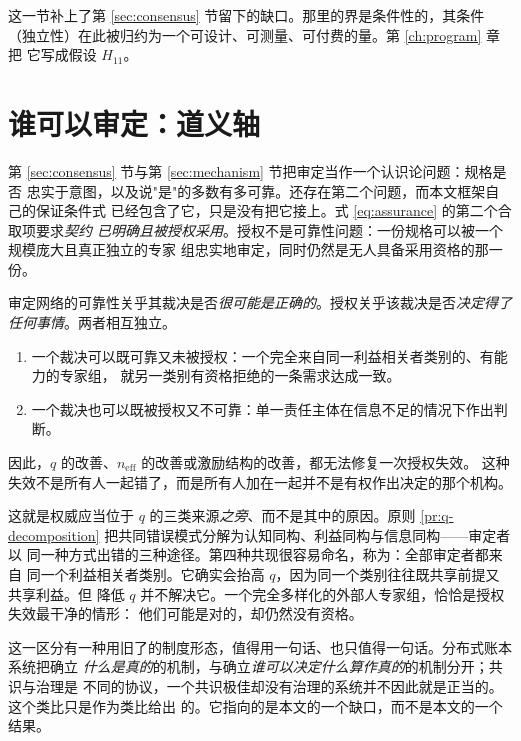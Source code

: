 这一节补上了第 \ref{sec:consensus} 节留下的缺口。那里的界是条件性的，其条件
（独立性）在此被归约为一个可设计、可测量、可付费的量。第 \ref{ch:program} 章把
它写成假设 $H_{11}$。

\section{谁可以审定：道义轴}\label{sec:authority}

第 \ref{sec:consensus} 节与第 \ref{sec:mechanism} 节把审定当作一个认识论问题：规格是否
忠实于意图，以及说"是"的多数有多可靠。还存在第二个问题，而本文框架自己的保证条件式
已经包含了它，只是没有把它接上。式 \eqref{eq:assurance} 的第二个合取项要求\emph{契约
已明确且被授权采用}。授权不是可靠性问题：一份规格可以被一个规模庞大且真正独立的专家
组忠实地审定，同时仍然是无人具备采用资格的那一份。

\begin{principle}[授权是一条独立的失效轴]\label{pr:authority}
审定网络的可靠性关乎其裁决是否\emph{很可能是正确的}。授权关乎该裁决是否\emph{决定得了
任何事情}。两者相互独立。
\begin{enumerate}[label=(\alph*)]
\item 一个裁决可以既可靠又未被授权：一个完全来自同一利益相关者类别的、有能力的专家组，
      就另一类别有资格拒绝的一条需求达成一致。
\item 一个裁决也可以既被授权又不可靠：单一责任主体在信息不足的情况下作出判断。
\end{enumerate}
因此，$q$ 的改善、$n_{\mathrm{eff}}$ 的改善或激励结构的改善，都无法修复一次授权失效。
这种失效不是所有人一起错了，而是所有人加在一起并不是有权作出决定的那个机构。
\end{principle}

这就是权威应当位于 $q$ 的三类来源\emph{之旁}、而不是其中的原因。原则
\ref{pr:q-decomposition} 把共同错误模式分解为认知同构、利益同构与信息同构——审定者以
同一种方式出错的三种途径。第四种共现很容易命名，称为：全部审定者都来自
同一个利益相关者类别。它确实会抬高 $q$，因为同一个类别往往既共享前提又共享利益。但
降低 $q$ 并不解决它。一个完全多样化的外部人专家组，恰恰是授权失效最干净的情形：
他们可能是对的，却仍然没有资格。

这一区分有一种用旧了的制度形态，值得用一句话、也只值得一句话。分布式账本系统把确立
\emph{什么是真的}的机制，与确立\emph{谁可以决定什么算作真的}的机制分开；共识与治理是
不同的协议，一个共识极佳却没有治理的系统并不因此就是正当的。这个类比只是作为类比给出
的。它指向的是本文的一个缺口，而不是本文的一个结果。

